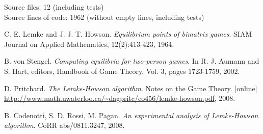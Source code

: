 \documentclass[a4paper,10pt]{article}
\begin{document}
\noindent
Source files: 12 (including tests) \\
Source lines of code: 1962 (without empty lines, including tests)

\begin{thebibliography}{9}
	 C. E. Lemke and J. J. T. Howson. \textit{Equilibrium
	points of bimatrix games}. SIAM Journal on Applied Mathematics,
	12(2):413-423, 1964.

	 B. von Stengel. \textit{Computing equilibria for
	two-person games}. In R. J. Aumann and S. Hart, editors, Handbook of Game
	Theory, Vol. 3, pages 1723-1759, 2002.

	 D. Pritchard. \textit{The Lemke-Howson algorithm}.
	Notes on the Game Theory. [online]
	\url{http://www.math.uwaterloo.ca/~dagpritc/co456/lemke-howson.pdf}, 2008.

	 B. Codenotti, S. D. Rossi, M. Pagan. \textit{An
	experimental analysis of Lemke-Howson algorithm}. CoRR abs/0811.3247, 2008.
\end{thebibliography}
\end{document}
